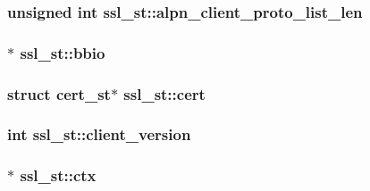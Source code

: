 \subsubsection[{\texorpdfstring{alpn\+\_\+client\+\_\+proto\+\_\+list\+\_\+len}{alpn_client_proto_list_len}}]{\setlength{\rightskip}{0pt plus 5cm}unsigned int ssl\+\_\+st\+::alpn\+\_\+client\+\_\+proto\+\_\+list\+\_\+len}\hypertarget{structssl__st_addabb2640bb49fd919f2f82620b8d36a}{}\label{structssl__st_addabb2640bb49fd919f2f82620b8d36a}
\subsubsection[{\texorpdfstring{bbio}{bbio}}]{$\ast$ ssl\+\_\+st\+::bbio}\hypertarget{structssl__st_ab0e7dbfa9d11fab6879da0ad8625b65b}{}\label{structssl__st_ab0e7dbfa9d11fab6879da0ad8625b65b}
\subsubsection[{\texorpdfstring{cert}{cert}}]{\setlength{\rightskip}{0pt plus 5cm}struct cert\+\_\+st$\ast$ ssl\+\_\+st\+::cert}\hypertarget{structssl__st_a335d212e807952601a0eabf4dfd978eb}{}\label{structssl__st_a335d212e807952601a0eabf4dfd978eb}
\subsubsection[{\texorpdfstring{client\+\_\+version}{client_version}}]{\setlength{\rightskip}{0pt plus 5cm}int ssl\+\_\+st\+::client\+\_\+version}\hypertarget{structssl__st_af898db9604614a95a6830fbb5ce31850}{}\label{structssl__st_af898db9604614a95a6830fbb5ce31850}
\subsubsection[{\texorpdfstring{ctx}{ctx}}]{$\ast$ ssl\+\_\+st\+::ctx}\hypertarget{structssl__st_a5a3ac76eff749d5d3c9ecf6b1a230497}{}\label{structssl__st_a5a3ac76eff749d5d3c9ecf6b1a230497}
